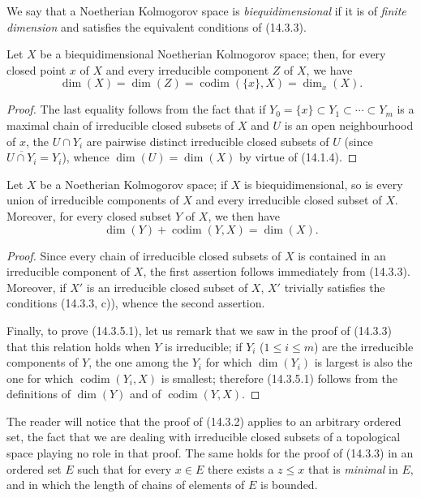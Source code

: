 We say that a Noetherian Kolmogorov space is \emph{biequidimensional}
if it is of \emph{finite dimension} and satisfies the equivalent conditions
of (14.3.3).

\begin{corollary}[14.3.4]
\label{0.14.3.4}
Let $X$ be a biequidimensional Noetherian Kolmogorov space; then, for
every closed point $x$ of $X$ and every irreducible component $Z$ of $X$, we have
\[
  \dim(X)=\dim(Z)=\operatorname{codim}(\{x\},X)=\dim_x(X).
  \tag{14.3.4.1}\label{0.14.3.4.1}
\]
\end{corollary}

\begin{proof}
The last equality follows from the fact that if
$Y_0=\{x\}\subset Y_1\subset\cdots\subset Y_m$ is a maximal chain of
irreducible closed subsets of $X$ and $U$ is an open neighbourhood of $x$, the
$U\cap Y_i$ are pairwise distinct irreducible closed subsets of $U$
(since $\overline{U\cap Y_i}=Y_i$), whence
$\dim(U)=\dim(X)$ by virtue of (14.1.4).
\end{proof}

\begin{corollary}[14.3.5]
\label{0.14.3.5}
Let $X$ be a Noetherian Kolmogorov space; if $X$ is
biequidimensional, so is every union of irreducible
components of $X$ and every irreducible closed subset of $X$. Moreover,
for every closed subset $Y$ of $X$, we then have
\[
  \dim(Y)+\operatorname{codim}(Y,X)=\dim(X).
  \tag{14.3.5.1}\label{0.14.3.5.1}
\]
\end{corollary}

\begin{proof}
Since every chain of irreducible closed subsets of $X$ is contained in an
irreducible component of $X$, the first assertion follows immediately from
(14.3.3). Moreover, if $X'$ is an irreducible closed subset of $X$, $X'$
trivially satisfies the conditions (14.3.3, c)), whence the second assertion.

Finally, to prove (14.3.5.1), let us remark that we saw in the
proof of (14.3.3) that this relation holds when $Y$ is
irreducible; if $Y_i$ ($1\leq i\leq m$) are the irreducible components
of $Y$, the one among the $Y_i$ for which $\dim(Y_i)$ is largest is also
the one for which $\operatorname{codim}(Y_i,X)$ is smallest; therefore
(14.3.5.1) follows from the definitions of $\dim(Y)$ and of
$\operatorname{codim}(Y,X)$.
\end{proof}

\begin{remark}[14.3.6]
\label{0.14.3.6}
The reader will notice that the proof of (14.3.2) applies to an
arbitrary ordered set, the fact that we are dealing with irreducible closed
subsets of a topological space playing no role in that
proof. The same holds for the proof of (14.3.3) in an
ordered set $E$ such that for every $x\in E$ there exists a $z\leq x$ that
is \emph{minimal} in $E$, and in which the length of chains of elements of $E$
is bounded.
\end{remark}
